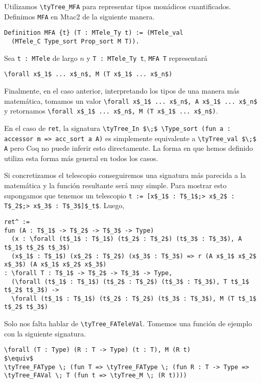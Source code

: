 Utilizamos \lstinline{\tyTree_MFA} para representar tipos monádicos cuantificados. Definimos \lstinline{MFA} en Mtac2 de la siguiente manera.

\begin{lstlisting}
Definition MFA {t} (T : MTele_Ty t) := (MTele_val
  (MTele_C Type_sort Prop_sort M T)).
\end{lstlisting}

Sea \lstinline{t : MTele} de largo $n$ y \lstinline{T : MTele_Ty t}, \lstinline{MFA T} representará
\begin{lstlisting}
\forall x$_1$ ... x$_n$, M (T x$_1$ ... x$_n$)
\end{lstlisting}

Finalmente, en el caso anterior, interpretando los tipos de una manera más matemática, tomamos un valor \lstinline{\forall x$_1$ ... x$_n$, A x$_1$ ... x$_n$} y retornamos \lstinline{\forall x$_1$ ... x$_n$, M (T x$_1$ ... x$_n$)}.

En el caso de \lstinline{ret}, la signatura \lstinline{\tyTree_In $\;$ \Type_sort (fun a : accessor m => acc_sort a A)} es simplemente equivalente a \lstinline{\tyTree_val $\;$ A} pero Coq no puede inferir esto directamente.
La forma en que hemos definido \lift{} utiliza esta forma más general en todos los casos.

Si concretizamos el telescopio conseguiremos una signatura más parecida a la matemática y la función resultante será muy simple.
Para mostrar esto supongamos que tenemos un telescopio \lstinline{t := [x$_1$ : T$_1$;> x$_2$ : T$_2$;> x$_3$ : T$_3$]$_t$}. Luego,

\begin{lstlisting}
ret^ :=
fun (A : T$_1$ -> T$_2$ -> T$_3$ -> Type)
  (x : \forall (t$_1$ : T$_1$) (t$_2$ : T$_2$) (t$_3$ : T$_3$), A t$_1$ t$_2$ t$_3$) 
  (x$_1$ : T$_1$) (x$_2$ : T$_2$) (x$_3$ : T$_3$) => r (A x$_1$ x$_2$ x$_3$) (A x$_1$ x$_2$ x$_3$)
: \forall T : T$_1$ -> T$_2$ -> T$_3$ -> Type,
  (\forall (t$_1$ : T$_1$) (t$_2$ : T$_2$) (t$_3$ : T$_3$), T t$_1$ t$_2$ t$_3$) ->
  \forall (t$_1$ : T$_1$) (t$_2$ : T$_2$) (t$_3$ : T$_3$), M (T t$_1$ t$_2$ t$_3$)
\end{lstlisting}

Solo nos falta hablar de \lstinline{\tyTree_FATeleVal}. Tomemos una función de ejemplo con la siguiente signatura.

\begin{lstlisting}
\forall (T : Type) (R : T -> Type) (t : T), M (R t)
$\equiv$
\tyTree_FAType \; (fun T => \tyTree_FAType \; (fun R : T -> Type => \tyTree_FAVal \; T (fun t => \tyTree_M \; (R t))))
\end{lstlisting}

